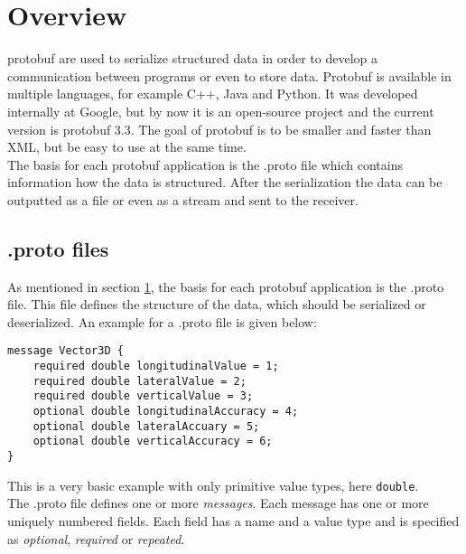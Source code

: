 \section{Overview}
\label{pb_overview}
\ac{protobuf} are used to serialize structured data in order to develop a communication between programs or even to store data. Protobuf is available in multiple languages, for example C++, Java and Python. It was developed internally at Google, but by now it is an open-source project and the current version is protobuf 3.3. The goal of protobuf is to be smaller and faster than XML, but be easy to use at the same time\cite{pb_overview}.\\
The basis for each protobuf application is the .proto file which contains information how the data is structured. After the serialization the data can be outputted as a file or even as a stream and sent to the receiver. 
\subsection{.proto files}
\label{pb_proto}
As mentioned in section \ref{pb_overview}, the basis for each protobuf application is the .proto file. This file defines the structure of the data, which should be serialized or deserialized. An example for a .proto file is given below:
\begin{lstlisting}[backgroundcolor=\color{lightlightgray}, title={Example protobuf definiton}, label=pb:vector3D]
message Vector3D {
    required double longitudinalValue = 1;
    required double lateralValue = 2;
    required double verticalValue = 3;
    optional double longitudinalAccuracy = 4;
    optional double lateralAccuary = 5;
    optional double verticalAccuracy = 6;
}
\end{lstlisting}
This is a very basic example with only primitive value types, here \verb|double|.\\
The .proto file defines one or more \emph{messages}. Each message has one or more uniquely numbered fields. Each field has a name and a value type and is specified as \emph{optional}, \emph{required} or \emph{repeated}.
